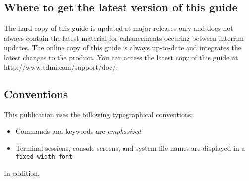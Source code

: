 	\subsection{Where to get the latest version of this guide}
	The hard copy of this guide is updated at major releases only and does
	not always contain the latest material for enhancements occuring between
	interrim updates. The online copy of this guide is always up-to-date and
	integrates the latest changes to the product. You can access the latest copy
	of this guide at http://www.tdmi.com/support/doc/.

	\subsection{Conventions}
	This publication uses the following typographical conventions:
	\begin{itemize}
	\item Commands and keywords are \emph{emphasized}
	\item Terminal sessions, console screens, and system file names are displayed
	      in a \texttt{fixed width font}
	\end{itemize}
	In addition, 

